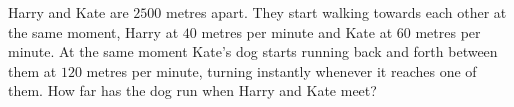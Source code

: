 Harry and Kate are $2500$ metres apart. They start walking towards each other at the same moment, Harry at $40$ metres per minute and Kate at $60$ metres per minute. At the same moment Kate's dog starts running back and forth between them at $120$ metres per minute, turning instantly whenever it reaches one of them. How far has the dog run when Harry and Kate meet?
